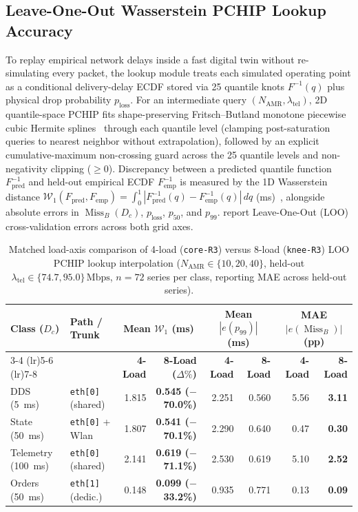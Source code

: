 \documentclass[11pt,a4paper]{article}
\newcommand{\Namr}{\ensuremath{N_{\mathrm{AMR}}}}
\newcommand{\ltel}{\ensuremath{\lambda_{\mathrm{tel}}}}
\newcommand{\MissB}{\ensuremath{\operatorname{Miss}_B}}
\newcommand{\ploss}{\ensuremath{p_{\mathrm{loss}}}}
\newcommand{\Wone}{\ensuremath{\mathcal{W}_1}}
\begin{document}
\subsection{Leave-One-Out Wasserstein PCHIP Lookup Accuracy}
\label{sec:pchip_accuracy}

To replay empirical network delays inside a fast digital twin without re-simulating every packet, the lookup module treats each simulated operating point as a conditional delivery-delay ECDF stored via 25 quantile knots $F^{-1}(q)$ plus physical drop probability $\ploss$. For an intermediate query $(\Namr, \ltel)$, 2D quantile-space PCHIP fits shape-preserving Fritsch--Butland monotone piecewise cubic Hermite splines~\cite{fritsch1984pchip} through each quantile level (clamping post-saturation queries to nearest neighbor without extrapolation), followed by an explicit cumulative-maximum non-crossing guard across the 25 quantile levels and non-negativity clipping ($\ge 0$). Discrepancy between a predicted quantile function $F_{\mathrm{pred}}^{-1}$ and held-out empirical ECDF $F_{\mathrm{emp}}^{-1}$ is measured by the 1D Wasserstein distance $\Wone(F_{\mathrm{pred}}, F_{\mathrm{emp}}) = \int_0^1 |F_{\mathrm{pred}}^{-1}(q) - F_{\mathrm{emp}}^{-1}(q)|\,dq$ (\si{\milli\second})~\cite{panaretos2019wasserstein}, alongside absolute errors in $\MissB(D_c)$, $\ploss$, $p_{50}$, and $p_{99}$.  report Leave-One-Out (LOO) cross-validation errors across both grid axes.

\begin{table}[!tb]
\centering
\footnotesize
\setlength{\tabcolsep}{2.2pt}
\caption{Matched load-axis comparison of 4-load (\texttt{core-R3}) versus 8-load (\texttt{knee-R3}) LOO PCHIP lookup interpolation ($\Namr \in \{10,20,40\}$, held-out $\ltel \in \{74.7, 95.0\}\,\text{Mbps}$, $n=72$ series per class, reporting MAE across held-out series).}
\label{tab:pchip_loo}
\begin{tabular}{@{}l l r r r r r r@{}}
\toprule
\textbf{Class ($D_c$)} & \textbf{Path / Trunk} & \multicolumn{2}{c}{\textbf{Mean $\Wone$ (ms)}} & \multicolumn{2}{c}{\textbf{Mean $|e(p_{99})|$ (ms)}} & \multicolumn{2}{c}{\textbf{MAE $|e(\MissB)|$ (pp)}} \\
\cmidrule(lr){3-4} \cmidrule(lr){5-6} \cmidrule(lr){7-8}
 & & \textbf{4-Load} & \textbf{8-Load ($\Delta\%$)} & \textbf{4-Load} & \textbf{8-Load} & \textbf{4-Load} & \textbf{8-Load} \\
\midrule
DDS (\qty{5}{\milli\second}) & \texttt{eth[0]} (shared) & 1.815 & \textbf{0.545 ($-$70.0\%)} & 2.251 & 0.560 & 5.56 & \textbf{3.11} \\
State (\qty{50}{\milli\second}) & \texttt{eth[0]} + Wlan & 1.807 & \textbf{0.541 ($-$70.1\%)} & 2.290 & 0.640 & 0.47 & \textbf{0.30} \\
Telemetry (\qty{100}{\milli\second}) & \texttt{eth[0]} (shared) & 2.141 & \textbf{0.619 ($-$71.1\%)} & 2.530 & 0.619 & 5.10 & \textbf{2.52} \\
Orders (\qty{50}{\milli\second}) & \texttt{eth[1]} (dedic.) & 0.148 & \textbf{0.099 ($-$33.2\%)} & 0.935 & 0.771 & 0.13 & \textbf{0.09} \\
\bottomrule
\end{tabular}
\end{table}
\end{document}
